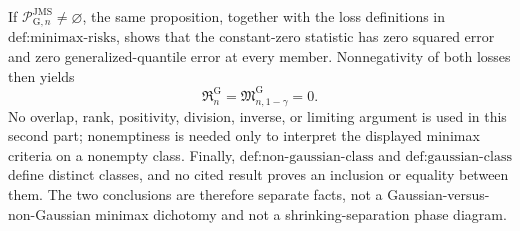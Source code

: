 If \(\mathcal P_{\mathrm G,n}^{\mathrm{JMS}}\neq\varnothing\), the same proposition, together with the loss definitions in \(\text{def:minimax-risks}\), shows that the constant-zero statistic has zero squared error and zero generalized-quantile error at every member.  Nonnegativity of both losses then yields
\[
 \mathfrak R_n^{\mathrm G}
 =\mathfrak M_{n,1-\gamma}^{\mathrm G}
 =0.
\]
No overlap, rank, positivity, division, inverse, or limiting argument is used in this second part; nonemptiness is needed only to interpret the displayed minimax criteria on a nonempty class.  Finally, \(\text{def:non-gaussian-class}\) and \(\text{def:gaussian-class}\) define distinct classes, and no cited result proves an inclusion or equality between them.  The two conclusions are therefore separate facts, not a Gaussian-versus-non-Gaussian minimax dichotomy and not a shrinking-separation phase diagram.